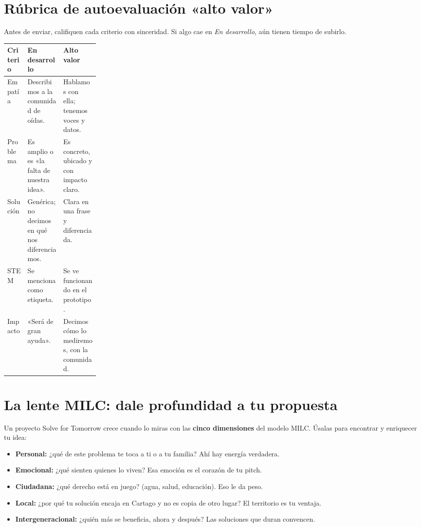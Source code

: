 \documentclass[11pt, letterpaper]{article}
\begin{document}
\section{Rúbrica de autoevaluación «alto valor»}

Antes de enviar, califiquen cada criterio con sinceridad. Si algo cae en \emph{En desarrollo}, aún tienen tiempo de subirlo.

\begin{center}
\renewcommand{\arraystretch}{1.35}
\begin{tabularx}{\linewidth}{@{}p{0.22\linewidth} X X@{}}
\toprule
\textbf{\color{smjAzul}Criterio} & \textbf{\color{smjVino}En desarrollo} & \textbf{\color{valorVerde}Alto valor}\\
\midrule
Empatía & Describimos a la comunidad de oídas. & Hablamos con ella; tenemos voces y datos.\\
Problema & Es amplio o es «la falta de nuestra idea». & Es concreto, ubicado y con impacto claro.\\
Solución & Genérica; no decimos en qué nos diferenciamos. & Clara en una frase y diferenciada.\\
STEM & Se menciona como etiqueta. & Se ve funcionando en el prototipo.\\
Impacto & «Será de gran ayuda». & Decimos cómo lo mediremos, con la comunidad.\\
\bottomrule
\end{tabularx}
\end{center}

\section{La lente MILC: dale profundidad a tu propuesta}

Un proyecto Solve for Tomorrow crece cuando lo miras con las \textbf{cinco dimensiones} del modelo MILC. Úsalas para encontrar y enriquecer tu idea:

\begin{milcbox}
\begin{itemize}[nosep]
  \item \textbf{Personal:} ¿qué de este problema te toca a ti o a tu familia? Ahí hay energía verdadera.
  \item \textbf{Emocional:} ¿qué sienten quienes lo viven? Esa emoción es el corazón de tu pitch.
  \item \textbf{Ciudadana:} ¿qué derecho está en juego? (agua, salud, educación). Eso le da peso.
  \item \textbf{Local:} ¿por qué tu solución encaja en Cartago y no es copia de otro lugar? El territorio es tu ventaja.
  \item \textbf{Intergeneracional:} ¿quién más se beneficia, ahora y después? Las soluciones que duran convencen.
\end{itemize}
\end{milcbox}
\end{document}
